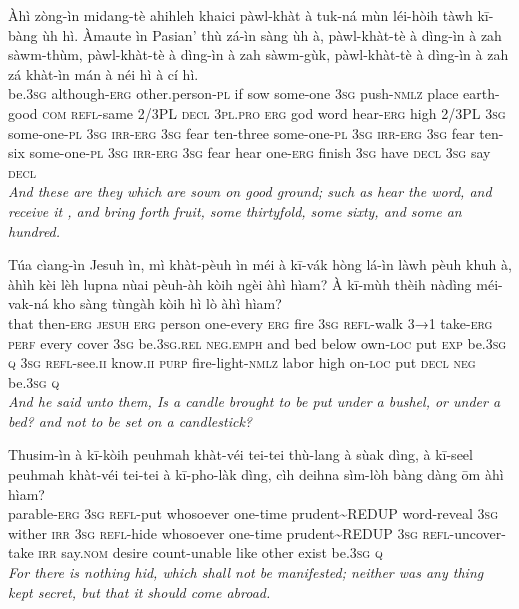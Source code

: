 \documentclass[11pt,a4paper]{article}
\begin{document}
\begin{exe}
\gll Àhì zòng-ìn midang-tè ahihleh khaici pàwl-khàt à tuk-ná mùn léi-hòih tàwh kī-bàng ùh hì. Àmaute ìn Pasian' thù zá-ìn sàng ùh à, pàwl-khàt-tè à dìng-ìn à zah sàwm-thùm, pàwl-khàt-tè à dìng-ìn à zah sàwm-gùk, pàwl-khàt-tè à dìng-ìn à zah zá khàt-ìn mán à néi hì à cí hì. \\
     be.\textsc{3sg} although-\textsc{erg} other.person-\textsc{pl} if sow some-one \textsc{3sg} push-\textsc{nmlz} place earth-good \textsc{com} \textsc{refl}-same 2/3PL \textsc{decl} \textsc{3pl}.\textsc{pro} \textsc{erg} god word hear-\textsc{erg} high 2/3PL \textsc{3sg} some-one-\textsc{pl} \textsc{3sg} \textsc{irr}-\textsc{erg} \textsc{3sg} fear ten-three some-one-\textsc{pl} \textsc{3sg} \textsc{irr}-\textsc{erg} \textsc{3sg} fear ten-six some-one-\textsc{pl} \textsc{3sg} \textsc{irr}-\textsc{erg} \textsc{3sg} fear hear one-\textsc{erg} finish \textsc{3sg} have \textsc{decl} \textsc{3sg} say \textsc{decl} \\
\glt \textcolor{kjvcolor}{\textit{And these are they which are sown on good ground; such as hear the word, and receive it , and bring forth fruit, some thirtyfold, some sixty, and some an hundred.}}

\gll Túa cìang-ìn Jesuh ìn, mì khàt-pèuh ìn méi à kī-vák hòng lá-ìn làwh pèuh khuh à, àhìh kèi lèh lupna nùai pèuh-àh kòih ngèi àhì hìam? À kī-mùh thèih nàdìng méi-vak-ná kho sàng tùngàh kòih hì lò àhì hìam? \\
     that then-\textsc{erg} \textsc{jesuh} \textsc{erg} person one-every \textsc{erg} fire \textsc{3sg} \textsc{refl}-walk \textsc{3→1} take-\textsc{erg} \textsc{perf} every cover \textsc{3sg} be.\textsc{3sg}.\textsc{rel} \textsc{neg}.\textsc{emph} and bed below own-\textsc{loc} put \textsc{exp} be.\textsc{3sg} \textsc{q} \textsc{3sg} \textsc{refl}-see.\textsc{ii} know.\textsc{ii} \textsc{purp} fire-light-\textsc{nmlz} labor high on-\textsc{loc} put \textsc{decl} \textsc{neg} be.\textsc{3sg} \textsc{q} \\
\glt \textcolor{kjvcolor}{\textit{And he said unto them, Is a candle brought to be put under a bushel, or under a bed? and not to be set on a candlestick?}}

\gll Thusim-ìn à kī-kòih peuhmah khàt-véi tei-tei thù-lang à sùak dìng, à kī-seel peuhmah khàt-véi tei-tei à kī-pho-làk dìng, cìh deihna sìm-lòh bàng dàng ōm àhì hìam? \\
     parable-\textsc{erg} \textsc{3sg} \textsc{refl}-put whosoever one-time prudent\textasciitilde{}REDUP word-reveal \textsc{3sg} wither \textsc{irr} \textsc{3sg} \textsc{refl}-hide whosoever one-time prudent\textasciitilde{}REDUP \textsc{3sg} \textsc{refl}-uncover-take \textsc{irr} say.\textsc{nom} desire count-unable like other exist be.\textsc{3sg} \textsc{q} \\
\glt \textcolor{kjvcolor}{\textit{For there is nothing hid, which shall not be manifested; neither was any thing kept secret, but that it should come abroad.}}


\end{exe}
\end{document}
